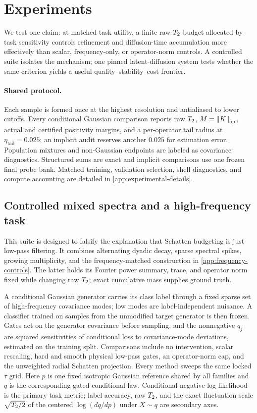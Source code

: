\section{Experiments}
\label{sec:experiments}

We test one claim: at matched task utility, a finite raw-$T_2$ budget allocated
by task sensitivity controls refinement and diffusion-time accumulation more
effectively than scalar, frequency-only, or operator-norm controls. A controlled
suite isolates the mechanism; one pinned latent-diffusion system tests whether
the same criterion yields a useful quality--stability--cost frontier.

\paragraph{Shared protocol.}
Each sample is formed once at the highest resolution and antialiased to lower
cutoffs. Every conditional Gaussian comparison reports raw $T_2$,
$M=\left\lVert K \right\rVert_{\mathrm{op}}$, actual and certified positivity margins, and a per-operator tail radius at
$\eta_{\mathrm{tail}}=0.025$; an implicit audit reserves another $0.025$ for
estimation error. Population mixtures and non-Gaussian endpoints are labeled as
covariance diagnostics. Structured sums are exact and implicit comparisons use
one frozen final probe bank. Matched training, validation selection, shell
diagnostics, and compute accounting are detailed in
\cref{app:experimental-details}.

\subsection{Controlled mixed spectra and a high-frequency task}
\label{sec:exp-controlled}

This suite is designed to falsify the explanation that Schatten budgeting is
just low-pass filtering. It combines alternating dyadic decay, sparse spectral
spikes, growing multiplicity, and the frequency-matched construction in
\cref{app:frequency-controls}. The latter holds its Fourier power summary,
trace, and operator norm fixed while changing raw $T_2$; exact cumulative
mass supplies ground truth.

A conditional Gaussian generator carries its class label through a fixed sparse
set of high-frequency covariance modes; low modes are label-independent
nuisance. A classifier trained on samples from the unmodified target generator
is then frozen. Gates act on the generator covariance before sampling, and the
nonnegative $q_j$ are squared sensitivities of conditional loss to
covariance-mode deviations, estimated on the training split. Comparisons include
no intervention, scalar rescaling, hard and smooth physical low-pass gates, an
operator-norm cap, and the unweighted radial Schatten projection. Every method
sweeps the same locked $\tau$ grid. Here $p$ is one fixed isotropic Gaussian
reference shared by all families and $q$ is the corresponding gated conditional
law. Conditional negative log likelihood is the
primary task metric; label accuracy, raw $T_2$, and the exact fluctuation
scale $\sqrt{T_2/2}$ of the centered $\log(dq/dp)$ under $X\sim q$ are
secondary axes.

